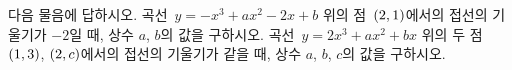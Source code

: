 다음 물음에 답하시오.
 곡선~$y=-x^3+ax^2-2x+b$ 위의 점~$(2{,}\mkern3mu\mathopen{}1)$에서의 접선의 기울기가 $-2$일 때, 상수 $a$, $b$의 값을 구하시오.
 곡선~$y=2x^3+ax^2+bx$ 위의 두 점~$(1{,}\mkern3mu\mathopen{}3)$, $(2{,}\mkern3mu\mathopen{}c)$에서의 접선의 기울기가 같을 때, 상수 $a$, $b$, $c$의 값을 구하시오.
